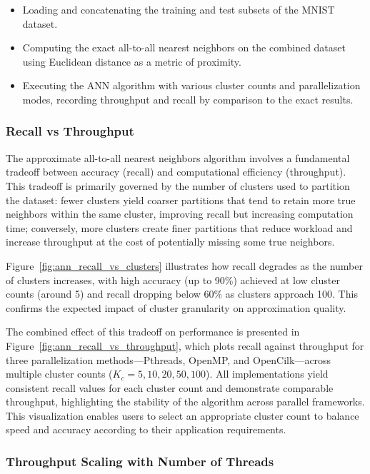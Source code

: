\documentclass{article}
\begin{document}
\begin{itemize}
    \item Loading and concatenating the training and test subsets of the MNIST dataset.
    \item Computing the exact all-to-all nearest neighbors on the combined dataset using Euclidean distance 
    as a metric of proximity.
    \item Executing the ANN algorithm with various cluster counts and parallelization modes, recording 
    throughput and recall by comparison to the exact results.
\end{itemize}

\subsubsection{Recall vs Throughput}

The approximate all-to-all nearest neighbors algorithm involves a fundamental tradeoff between accuracy 
(recall) and computational efficiency (throughput). This tradeoff is primarily governed by the number of 
clusters used to partition the dataset: fewer clusters yield coarser partitions that tend to retain more 
true neighbors within the same cluster, improving recall but increasing computation time; conversely, 
more clusters create finer partitions that reduce workload and increase throughput at the cost of 
potentially missing some true neighbors.

Figure~\ref{fig:ann_recall_vs_clusters} illustrates how recall degrades as the number of clusters increases, 
with high accuracy (up to 90\%) achieved at low cluster counts (around 5) and recall dropping below 60\% as 
clusters approach 100. This confirms the expected impact of cluster granularity on approximation quality.

The combined effect of this tradeoff on performance is presented in Figure~\ref{fig:ann_recall_vs_throughput},
which plots recall against throughput for three parallelization methods—Pthreads, OpenMP, and OpenCilk—across 
multiple cluster counts ($K_c = 5, 10, 20, 50, 100$). All implementations yield consistent recall values for 
each cluster count and demonstrate comparable throughput, highlighting the stability of the algorithm across 
parallel frameworks. This visualization enables users to select an appropriate cluster count to balance speed 
and accuracy according to their application requirements.

\subsubsection{Throughput Scaling with Number of Threads}
\end{document}
